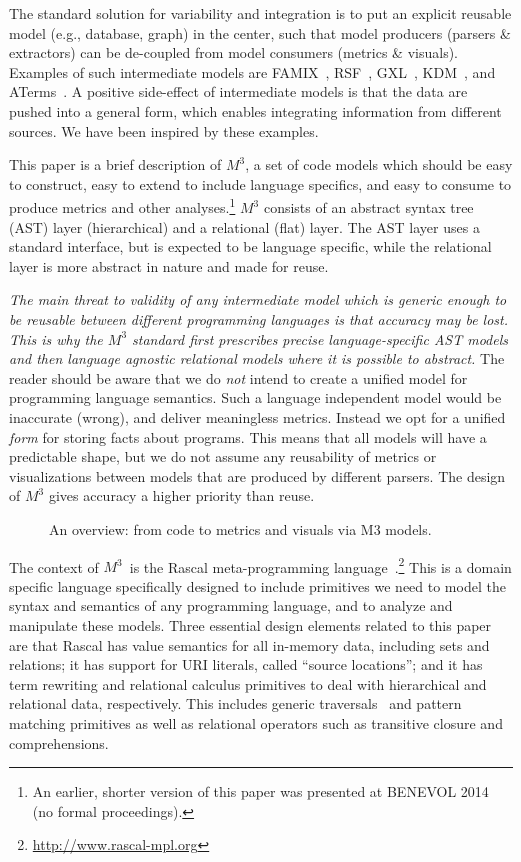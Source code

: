 \documentclass[conference]{IEEEtran}
\newcommand{\mthree}{\ensuremath{M^3}\xspace}
\begin{document}
The standard solution for variability and integration is to put an explicit
reusable model (e.g., database, graph) in the center, such that model
producers (parsers \& extractors) can be de-coupled from model consumers
(metrics \& visuals). Examples of such intermediate models are
FAMIX~\cite{famix}, RSF~\cite{Mueller88}, GXL~\cite{HWS00}, KDM~\cite{omg-kdm},
and ATerms~\cite{BJKO00}. A positive side-effect of intermediate models
is that the data are pushed into a general form, which enables integrating
information from different sources. We have been inspired by these examples.

This paper is a brief description of \mthree, a set of code models which
should be easy to construct, easy to extend to include language specifics, and
easy to consume to produce metrics and other analyses.\!\footnote{An earlier,
shorter version of this paper was presented at BENEVOL 2014 (no formal
proceedings).} \mthree consists of an abstract syntax tree (AST) layer
(hierarchical) and a relational (flat) layer. The AST layer uses a standard
interface, but is expected to be language specific, while the relational layer
is more abstract in nature and made for reuse.

\emph{The main threat to validity of any intermediate model which is generic
enough to be reusable between different programming languages is that accuracy
may be lost. This is why the \mthree standard first prescribes precise
language-specific AST models and then language agnostic relational models
where it is possible to abstract.} The reader should be aware that we do
\emph{not} intend to create a unified model for programming language
semantics. Such a language independent model would be inaccurate (wrong), and
deliver meaningless metrics. Instead we opt for a unified \emph{form} for
storing facts about programs. This means that all models will have a
predictable shape, but we do not assume any reusability of metrics or
visualizations between models that are produced by different parsers. The
design of \mthree  gives accuracy a higher priority than reuse.

\begin{figure}[t]
	\resizebox{\columnwidth}{!}{}
\caption{An overview: from code to metrics and visuals via M3 models.}
\end{figure}

The context of \mthree\ is the Rascal meta-programming language~\cite{KvdSV-
Rascal11,rascalscam}.\footnote{\url{http://www.rascal-mpl.org}} This is a
domain specific language specifically designed to include primitives we need
to model the syntax and semantics of any programming language, and to analyze
and manipulate these models. Three essential design elements related to this
paper are that Rascal has value semantics for all in-memory data, including
sets and relations; it has support for URI literals, called ``source
locations''; and it has term rewriting and relational calculus primitives to
deal with hierarchical and relational data, respectively. This includes
generic traversals~\cite{Traversals} and pattern matching primitives as well
as relational operators such as transitive closure and comprehensions.
\end{document}
